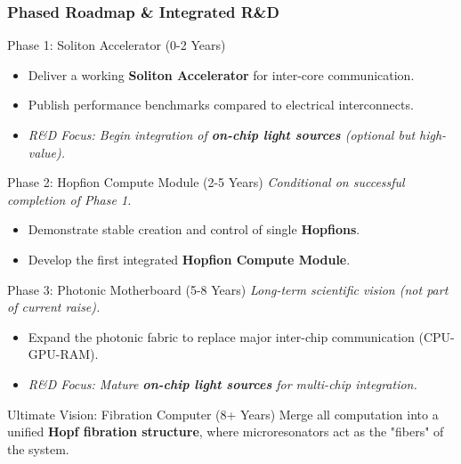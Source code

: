 \documentclass{beamer}
\begin{document}
\begin{frame}[allowframebreaks]
    \frametitle{Phased Roadmap \& Integrated R\&D}

    \begin{block}{Phase 1: Soliton Accelerator (0-2 Years)}
        \begin{itemize}
            \item Deliver a working \textbf{Soliton Accelerator} for inter-core communication.
            \item Publish performance benchmarks compared to electrical interconnects.
            \item \textit{R\&D Focus: Begin integration of \textbf{on-chip light sources} (optional but high-value).}
        \end{itemize}
    \end{block}

    \begin{block}{Phase 2: Hopfion Compute Module (2-5 Years)}
        \textit{Conditional on successful completion of Phase 1.}
        \begin{itemize}
            \item Demonstrate stable creation and control of single \textbf{Hopfions}.
            \item Develop the first integrated \textbf{Hopfion Compute Module}.
        \end{itemize}
    \end{block}

    \framebreak

    \begin{block}{Phase 3: Photonic Motherboard (5-8 Years)}
        \textit{Long-term scientific vision (not part of current raise).}
        \begin{itemize}
            \item Expand the photonic fabric to replace major inter-chip communication (CPU-GPU-RAM).
            \item \textit{R\&D Focus: Mature \textbf{on-chip light sources} for multi-chip integration.}
        \end{itemize}
    \end{block}

    \begin{alertblock}{Ultimate Vision: Fibration Computer (8+ Years)}
        Merge all computation into a unified \textbf{Hopf fibration structure}, where microresonators act as the "fibers" of the system.
    \end{alertblock}

\end{frame}
\end{document}

